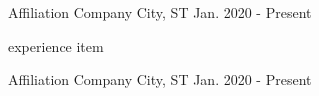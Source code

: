 

\begin{cventries}

  \cventry
    {Affiliation} %
    {Company} %
    {City, ST} %
    {Jan. 2020 - Present} %
    {
      \begin{cvitems} %
        \item {experience item} \\
      \end{cvitems}
    }

  \cventryup
    {Affiliation} %
    {Company} %
    {City, ST} %
    {Jan. 2020 - Present} %
    {
      \begin{cvitems} %
      \end{cvitems}
}

\end{cventries}
